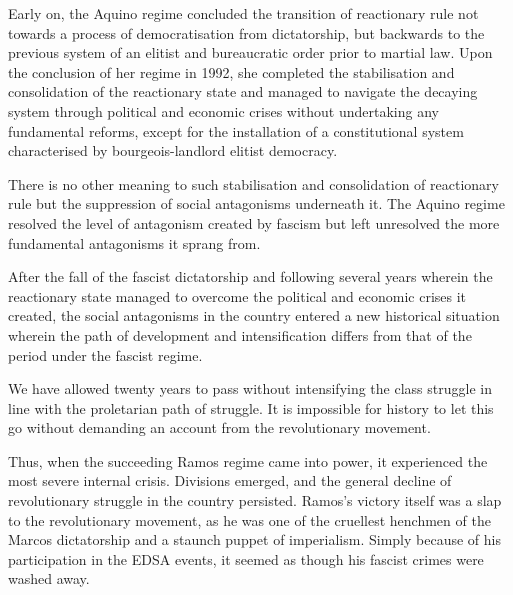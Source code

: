 Early on, 
the Aquino regime concluded the transition of reactionary rule 
not towards a process of democratisation from dictatorship, 
but backwards to the previous system of an elitist and bureaucratic order 
prior to martial law.
Upon the conclusion of her regime in 1992, 
she completed the stabilisation and consolidation of the reactionary state 
and managed to navigate the decaying system 
through political and economic crises without undertaking 
any fundamental reforms, 
except for the installation of a constitutional system 
characterised by bourgeois-landlord elitist democracy.

There is no other meaning to such stabilisation and consolidation 
of reactionary rule 
but the suppression of social antagonisms underneath it. 
The Aquino regime resolved the level of antagonism created by fascism 
but left unresolved the more fundamental antagonisms it sprang from.

After the fall of the fascist dictatorship and following several years 
wherein the reactionary state managed to overcome 
the political and economic crises it created, 
the social antagonisms in the country entered a new historical situation 
wherein the path of development and intensification differs 
from that of the period under the fascist regime.

We have allowed twenty years to pass without 
intensifying the class struggle in line with the proletarian path of struggle. 
It is impossible for history to let this go without demanding an account 
from the revolutionary movement.

Thus, when the succeeding Ramos regime came into power, 
it experienced the most severe internal crisis. 
Divisions emerged, 
and the general decline of revolutionary struggle in the country persisted. 
Ramos's victory itself was a slap to the revolutionary movement, 
as he was one of the cruellest henchmen of the Marcos dictatorship 
and a staunch puppet of imperialism. 
Simply because of his participation in the EDSA events, 
it seemed as though his fascist crimes were washed away.

\section{}

